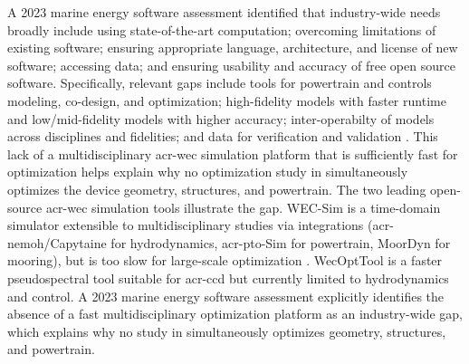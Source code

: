     A 2023 marine energy software assessment \citep{ruehl_next-generation_2023} identified that industry-wide needs broadly include using state-of-the-art computation; overcoming limitations of existing software; ensuring appropriate language, architecture, and license of new software; accessing data; and ensuring usability and accuracy of free open source software.
    Specifically, relevant gaps include tools for powertrain and controls modeling, co-design, and optimization; high-fidelity models with faster runtime and low/mid-fidelity models with higher accuracy; inter-operabilty of models across disciplines and fidelities; and data for verification and validation \citep{ruehl_next-generation_2023}.
    This lack of a multidisciplinary \gls{acr-wec} simulation platform that is sufficiently fast for optimization helps explain why no optimization study in  simultaneously optimizes the device geometry, structures, and powertrain.
\else
    The two leading open-source \gls{acr-wec} simulation tools illustrate the gap.
    WEC-Sim \citep{ruehl_wec-simwec-sim_2024} is a time-domain simulator extensible to multidisciplinary studies via integrations (\gls{acr-nemoh}/Capytaine for hydrodynamics, \gls{acr-pto}-Sim for powertrain, MoorDyn for mooring), but is too slow for large-scale optimization \citep{housner_numerical_2024}.
    WecOptTool \citep{coe_initial_2020} is a faster pseudospectral tool suitable for \gls{acr-ccd} but currently limited to hydrodynamics and control.
    A 2023 marine energy software assessment \citep{ruehl_next-generation_2023} explicitly identifies the absence of a fast multidisciplinary optimization platform as an industry-wide gap, which explains why no study in  simultaneously optimizes geometry, structures, and powertrain. 
    
